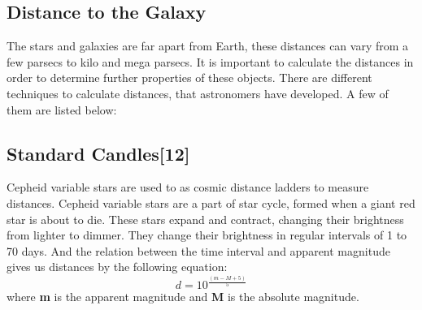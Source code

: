 \documentclass{article}
\begin{document}
\subsection{Distance to the Galaxy}
The stars and galaxies are far apart from Earth, these distances can vary from a few parsecs to kilo and mega parsecs. It is important to calculate the distances in order to determine further properties of these objects. There are different techniques to calculate distances, that astronomers have developed. 
A few of them are listed below:
\subsection*{Standard Candles[12]}
 Cepheid variable stars are used to as cosmic distance ladders to measure distances. Cepheid variable stars are a part of star cycle, formed when a giant red star is about to die. These stars expand and contract, changing their brightness from lighter to dimmer.  They change their brightness in regular intervals of 1 to 70 days. And the relation between the time interval and apparent magnitude gives us distances by the following equation:
 \begin{equation}
 d= 10^{\frac{(m-M+5)}{5}}
 \end{equation}
where \textbf{m} is the apparent magnitude and \textbf{M} is the absolute magnitude.
\end{document}
